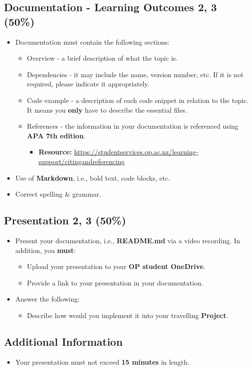 \documentclass{article}
\begin{document}
\subsection*{Documentation - Learning Outcomes 2, 3 (50\%)}
\begin{itemize}
	\item Documentation must contain the following sections:
	      \begin{itemize}
		      \item Overview - a brief description of what the topic is.
		      \item Dependencies - it may include the name, version number, etc. If it is not required, please indicate it appropriately.
		      \item Code example - a description of each code snippet in relation to the topic. It means you \textbf{only} have to describe the essential files.
		      \item References - the information in your documentation is referenced using \textbf{APA 7th edition}.
		            \begin{itemize}
			            \item \textbf{Resource:} \href{https://studentservices.op.ac.nz/learning-support/citingandreferencing}{https://studentservices.op.ac.nz/learning-support/citingandreferencing}
		            \end{itemize}
	      \end{itemize}
	\item Use of \textbf{Markdown}, i.e., bold text, code blocks, etc.
	\item Correct spelling \& grammar.
\end{itemize}

\subsection*{Presentation 2, 3 (50\%)}
\begin{itemize}
	\item Present your documentation, i.e., \textbf{README.md} via a video recording. In addition, you \textbf{must}:
	      \begin{itemize}
		      \item Upload your presentation to your \textbf{OP student OneDrive}.
		      \item Provide a link to your presentation in your documentation.
	      \end{itemize}
	\item Answer the following:
	      \begin{itemize}
		      \item Describe how would you implement it into your travelling \textbf{Project}.
	      \end{itemize}
\end{itemize}

\subsection*{Additional Information}
\begin{itemize}
	\item Your presentation must not exceed \textbf{15 minutes} in length.
\end{itemize}
\end{document}
